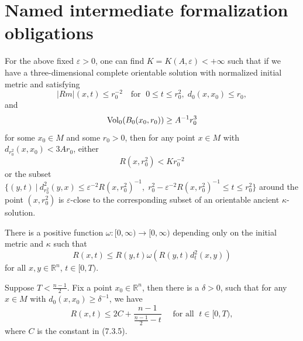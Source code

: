 \section{Named intermediate formalization obligations}
\begin{lemma}
  \label{lem:cz-local-ancient-model-alternative}
For the above fixed $\varepsilon>0$, one can find
$K=K(A,\varepsilon)<+\infty$ such that if we have a
three-dimensional complete orientable solution with normalized
initial metric and satisfying
$$
|Rm|(x,t)\le r_0^{-2}\quad \mbox{for }\; 0\le t\le
r_0^2,\;d_0(x,x_0)\le r_0,
$$
and
$$
\operatorname{Vol}_0(B_0(x_0,r_0))\ge A^{-1}r_0^3
$$
for some $x_0 \in M$ and some $r_0 > 0$, then for any point $x\in
M$ with $d_{r_0^2}(x,x_0)<3Ar_0$, either $$R(x,r_0^2)< Kr_0^{-2}$$
or the subset $\{(y,t)\ |\ d_{r_0^2}^2(y,x)\leq \varepsilon^{-2}
R(x,r_0^2)^{-1},\;r_0^2-\varepsilon^{-2} R(x,r_0^2)^{-1}\le t\le
r_0^2\}$ around the point $(x,r_0^2)$ is $\varepsilon$-close to
the corresponding subset of an orientable ancient
$\kappa$-solution.
\medskip

\end{lemma}
\begin{lemma}
  \label{lem:cz-standard-solution-spatial-curvature-comparison}
There is a positive function
$\omega:[0,\infty)\rightarrow[0,\infty)$ depending only on the
initial metric and $\kappa$ such that
$$
  R(x,t)\leq R(y,t)\omega(R(y,t)d_{t}^{2}(x,y))
$$
for all $x,y\in \mathbb{R}^{n}$, $t\in[0,T)$.
\end{lemma}
\begin{lemma}
  \label{lem:cz-standard-solution-maximal-time-curvature-blowup}
Suppose $T<\frac{n-1}{2}$. Fix a point $x_{0}\in
\mathbb{R}^{n} $, then there is a $\delta>0$, such that for any
$x\in M$ with $d_{0}(x,x_{0})\geq \delta^{-1}$, we have
$$
R(x,t)\leq 2C+\frac{n-1}{\frac{n-1}{2}-t}\quad \text{ for all }\;
t\in[0,T),
$$
where $C$ is the constant in (7.3.5).
\end{lemma}
